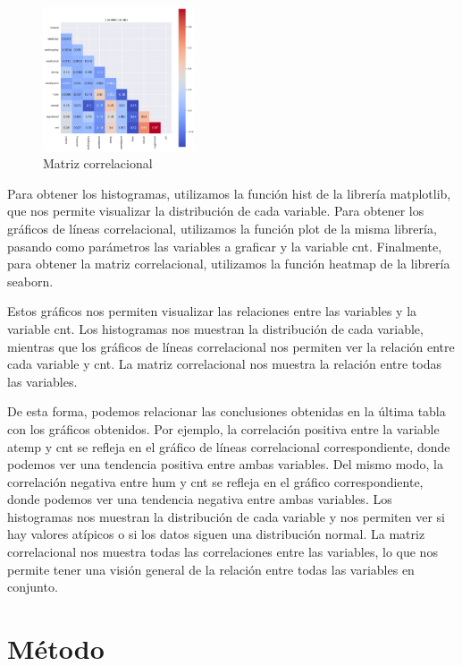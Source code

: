\documentclass{wsdcr}
\begin{document}
\begin{figure}[h]
    \centering
    \includegraphics[width=0.4\textwidth]{charts/correlational-matrix.png}
    \caption{Matriz correlacional}
    \label{fig:correlationmatrix}
\end{figure}

Para obtener los histogramas, utilizamos la función hist de la librería matplotlib, que nos permite visualizar la distribución de cada variable. Para obtener los gráficos de líneas correlacional, utilizamos la función plot de la misma librería, pasando como parámetros las variables a graficar y la variable cnt. Finalmente, para obtener la matriz correlacional, utilizamos la función heatmap de la librería seaborn.

Estos gráficos nos permiten visualizar las relaciones entre las variables y la variable cnt. Los histogramas nos muestran la distribución de cada variable, mientras que los gráficos de líneas correlacional nos permiten ver la relación entre cada variable y cnt. La matriz correlacional nos muestra la relación entre todas las variables.

De esta forma, podemos relacionar las conclusiones obtenidas en la última tabla con los gráficos obtenidos. Por ejemplo, la correlación positiva entre la variable atemp y cnt se refleja en el gráfico de líneas correlacional correspondiente, donde podemos ver una tendencia positiva entre ambas variables. Del mismo modo, la correlación negativa entre hum y cnt se refleja en el gráfico correspondiente, donde podemos ver una tendencia negativa entre ambas variables. Los histogramas nos muestran la distribución de cada variable y nos permiten ver si hay valores atípicos o si los datos siguen una distribución normal. La matriz correlacional nos muestra todas las correlaciones entre las variables, lo que nos permite tener una visión general de la relación entre todas las variables en conjunto.

\section{Método}
\end{document}
